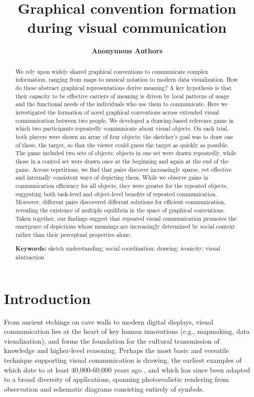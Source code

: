 \documentclass[10pt,letterpaper]{article}
\title{Graphical convention formation during visual communication}
\author{\large \bf Anonymous Authors}
\begin{document}
\maketitle

\begin{abstract}
We rely upon widely shared graphical conventions to communicate complex information, ranging from maps to musical notation to modern data visualization. 
How do these abstract graphical representations derive meaning? 
A key hypothesis is that their capacity to be effective carriers of meaning is driven by local patterns of usage and the functional needs of the individuals who use them to communicate. 
Here we investigated the formation of novel graphical conventions across extended visual communication between two people. 
We developed a drawing-based reference game in which two participants repeatedly communicate about visual objects. 
On each trial, both players were shown an array of four objects; the sketcher’s goal was to draw one of these, the target, so that the viewer could guess the target as quickly as possible. 
The game included two sets of objects: objects in one set were drawn repeatedly, while those in a control set were drawn once at the beginning and again at the end of the game. 
Across repetitions, we find that pairs discover increasingly sparse, yet effective and internally consistent ways of depicting them. 
While we observe gains in communication efficiency for all objects, they were greater for the repeated objects, suggesting both task-level and object-level benefits of repeated communication. 
Moreover, different pairs discovered different solutions for efficient communication, revealing the existence of multiple equilibria in the space of graphical conventions. 
Taken together, our findings suggest that repeated visual communication promotes the emergence of depictions whose meanings are increasingly determined by social context rather than their perceptual properties alone.

\textbf{Keywords:}
sketch understanding; social coordination; drawing; iconicity; visual abstraction

\end{abstract}

\section{Introduction}

From ancient etchings on cave walls to modern digital displays, visual communication lies at the heart of key human innovations (e.g., mapmaking, data visualization), and forms the foundation for the cultural transmission of knowledge and higher-level reasoning. 
Perhaps the most basic and versatile technique supporting visual communication is drawing, the earliest examples of which date to at least 40,000-60,000 years ago \cite{hoffmann2018u,Aubert:2014jy}, and which has since been adapted to a broad diversity of applications, spanning photorealistic rendering from observation and schematic diagrams consisting entirely of symbols. 
\end{document}
